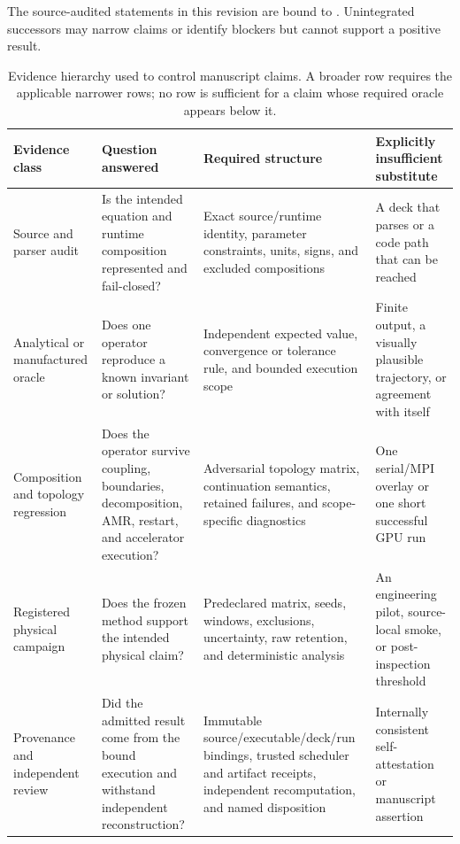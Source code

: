 \documentclass[twocolumn]{aastex701}
\begin{document}
The source-audited statements in this revision are bound to
. Unintegrated successors
may narrow claims or identify blockers but cannot support a positive result.

\begin{table}[htbp]
\centering
\caption{Evidence hierarchy used to control manuscript claims. A broader row
requires the applicable narrower rows; no row is sufficient for a claim whose
required oracle appears below it.}
\label{tab:evidence-classes}
\small
\begin{tabular}{p{} p{} p{}
                p{}}
\toprule
Evidence class & Question answered & Required structure & Explicitly
insufficient substitute \\
\midrule
Source and parser audit &
Is the intended equation and runtime composition represented and
fail-closed? &
Exact source/runtime identity, parameter constraints, units, signs, and
excluded compositions &
A deck that parses or a code path that can be reached \\
Analytical or manufactured oracle &
Does one operator reproduce a known invariant or solution? &
Independent expected value, convergence or tolerance rule, and bounded
execution scope &
Finite output, a visually plausible trajectory, or agreement with itself \\
Composition and topology regression &
Does the operator survive coupling, boundaries, decomposition, AMR, restart,
and accelerator execution? &
Adversarial topology matrix, continuation semantics, retained failures, and
scope-specific diagnostics &
One serial/MPI overlay or one short successful GPU run \\
Registered physical campaign &
Does the frozen method support the intended physical claim? &
Predeclared matrix, seeds, windows, exclusions, uncertainty, raw retention,
and deterministic analysis &
An engineering pilot, source-local smoke, or post-inspection threshold \\
Provenance and independent review &
Did the admitted result come from the bound execution and withstand
independent reconstruction? &
Immutable source/executable/deck/run bindings, trusted scheduler and artifact
receipts, independent recomputation, and named disposition &
Internally consistent self-attestation or manuscript assertion \\
\bottomrule
\end{tabular}
\end{table}
\end{document}
